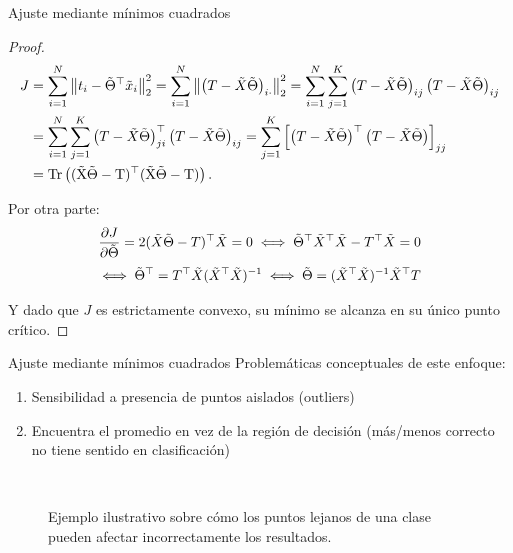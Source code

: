\documentclass[9pt, handout]{beamer}
\begin{document}
\begin{frame}{Ajuste mediante mínimos cuadrados}

\begin{proof}
\begin{align*}
  J &= \sum_{i=1}^N \norm{t_i - \tilde{\Theta}^\top\tx_i}_2^2 = \sum_{i=1}^N \norm{\left(T - \tX\tilde{\Theta}\right)_{i\cdot}}_2^2 = \sum_{i=1}^N \sum_{j=1}^K \left(T - \tX\tilde{\Theta}\right)_{ij} \left(T - \tX\tilde{\Theta}\right)_{ij}\\
  &= \sum_{i=1}^N \sum_{j=1}^K \left(T - \tX\tilde{\Theta}\right)^\top_{ji} \left(T - \tX\tilde{\Theta}\right)_{ij} =  \sum_{j=1}^K \left[\left(T - \tX\tilde{\Theta}\right)^\top \left(T - \tX\tilde{\Theta}\right)\right]_{jj}\\
  &=\operatorfont{Tr} \left((\tX\tilde{\Theta}-T)^\top (\tX\tilde{\Theta}-T)\right).
\end{align*}
  
Por otra parte:
\begin{equation*}
  \frac{\partial J}{\partial\tilde{\Theta}} = 2(\tilde{X}\tilde{\Theta}-T)^\top\tilde{X}=0 \iff \tilde{\Theta}^\top\tilde{X}^\top\tilde{X} - T^\top\tilde{X} = 0 
\end{equation*}
\begin{equation*}
\iff \tilde{\Theta}^\top = T^\top\tilde{X}(\tilde{X}^\top\tilde{X})^{-1}\iff \tilde{\Theta} = (\tilde{X}^\top\tilde{X})^{-1}\tilde{X}^\top T
\end{equation*}
  
Y dado que $J$ es estrictamente convexo, su mínimo se alcanza en su único punto crítico.  

\end{proof} 


\end{frame}

\begin{frame}{Ajuste mediante mínimos cuadrados}
Problemáticas conceptuales de este enfoque: 
\begin{enumerate}
  \item Sensibilidad a presencia de puntos aislados (outliers) \pause
  \item Encuentra el promedio en vez de la región de decisión (más/menos correcto no tiene sentido en clasificación)\pause
\end{enumerate}
\begin{figure}[H]
  \centering
  \\
  \caption{Ejemplo ilustrativo sobre cómo los puntos lejanos de una clase pueden afectar incorrectamente los resultados.}
  \label{fig:clasif_mse}
\end{figure}


\end{frame}
\end{document}
